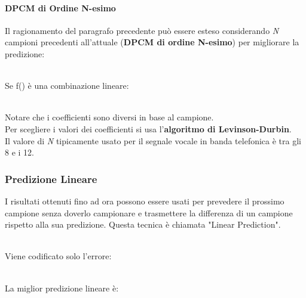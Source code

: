 \documentclass{article}
\begin{document}
				\paragraph{DPCM di Ordine N-esimo\\}
					Il ragionamento del paragrafo precedente può essere esteso considerando \textit{N} campioni precedenti all'attuale (\textbf{DPCM di ordine N-esimo}) per migliorare la predizione:
					\begin{figure}[ht!]
					\end{figure}
					\\Se f() è una combinazione lineare:
					\begin{figure}[ht!]
					\end{figure}
					\\Notare che i coefficienti sono diversi in base al campione.
					\\Per scegliere i valori dei coefficienti si usa l'\textbf{algoritmo di Levinson-Durbin}.
					\\Il valore di \textit{N} tipicamente usato per il segnale vocale in banda telefonica è tra gli 8 e i 12.

			\subsubsection{Predizione Lineare}
				I risultati ottenuti fino ad ora possono essere usati per prevedere il prossimo campione senza doverlo campionare e trasmettere la differenza di un campione rispetto alla sua predizione. Questa tecnica è chiamata "Linear Prediction".
				\begin{figure}[ht!]
				\end{figure}
				\\Viene codificato solo l'errore:
				\begin{figure}[ht!]
				\end{figure}
				\\La miglior predizione lineare è:
				\begin{figure}[ht!]
				\end{figure}
\end{document}
